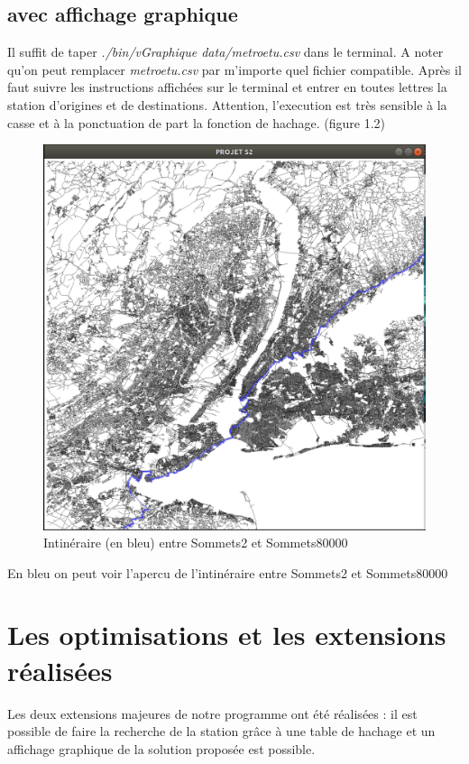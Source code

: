 \documentclass[12pt]{report}
\begin{document}
\subsection{avec affichage graphique}
Il suffit de taper \emph{./bin/vGraphique data/metroetu.csv} dans le terminal. A noter qu'on peut remplacer \emph{metroetu.csv} par m'importe quel fichier compatible. Après il faut suivre les instructions affichées sur le terminal et entrer en toutes lettres la station d'origines et de destinations. Attention, l'execution est très sensible à la casse et à la ponctuation de part la fonction de hachage. (figure 1.2)\newline
\begin{figure}
  \centering
    \includegraphics[width=13cm]{Sommets2a80000.png}
    \caption{Intinéraire (en bleu) entre Sommets2 et Sommets80000}
\end{figure}

En bleu on peut voir l'apercu de l'intinéraire entre Sommets2 et Sommets80000

\section{Les optimisations et les extensions réalisées}

Les deux extensions majeures de notre programme ont été réalisées : il est possible de faire la recherche de la station grâce à une table de hachage et un affichage graphique de la solution proposée est possible.
\end{document}
